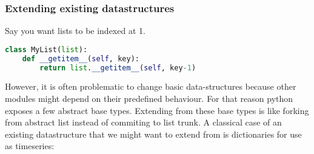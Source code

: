 \subsubsection{Extending existing datastructures}

Say you want lists to be indexed at 1. 
\begin{lstlisting}[language=python]
class MyList(list):
    def __getitem__(self, key):
        return list.__getitem__(self, key-1)
\end{lstlisting}

However, it is often problematic to change basic data-structures because other modules might depend on their predefined behaviour. For that reason python exposes a few abstract base types. Extending from these base types is like forking from abstract list instead of commiting to list trunk. A classical case of an existing datastructure that we might want to extend from is dictionaries for use as timeseries: 

